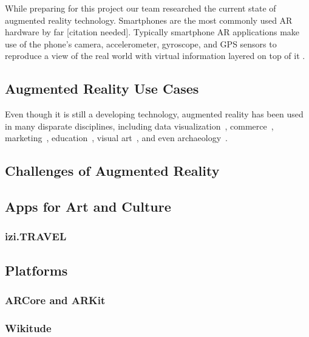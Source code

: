 \documentclass[a4paper, 10pt, american, titlepage]{article}
\begin{document}
While preparing for this project our team researched the current state of
augmented reality technology. Smartphones are the most commonly used AR
hardware by far [citation needed]. Typically smartphone AR applications make
use of the phone's camera, accelerometer, gyroscope, and GPS sensors to
reproduce a view of the real world with virtual information layered on top of
it \autocite{bonsor2018}.

\subsection{Augmented Reality Use Cases}
\label{sec:augmentedRealityUseCases}

Even though it is still a developing technology, augmented reality has been used
in many disparate disciplines, including data
visualization~\autocite{resnick2017}, commerce~\autocite{matney2018},
marketing~\autocite{sharma2015}, education~\autocite{stewart-smith2012}, visual
art~\autocite{katz2018}, and even archaeology~\autocite{eve2012}.

\subsection{Challenges of Augmented Reality}
\label{sec:challengesOfAugmentedReality}

\lipsum[1]

\subsection{Apps for Art and Culture}
\label{sec:appsForArtAndCulture}

\lipsum[2-3]

\subsubsection{izi.TRAVEL}
\label{sec:iziTravel}

\lipsum[4-5]

\subsection{Platforms}
\label{sec:platforms}

\subsubsection{ARCore and ARKit}
\label{sec:ARCoreAndARKit}

\subsubsection{Wikitude}
\label{sec:wikitude}
\end{document}

